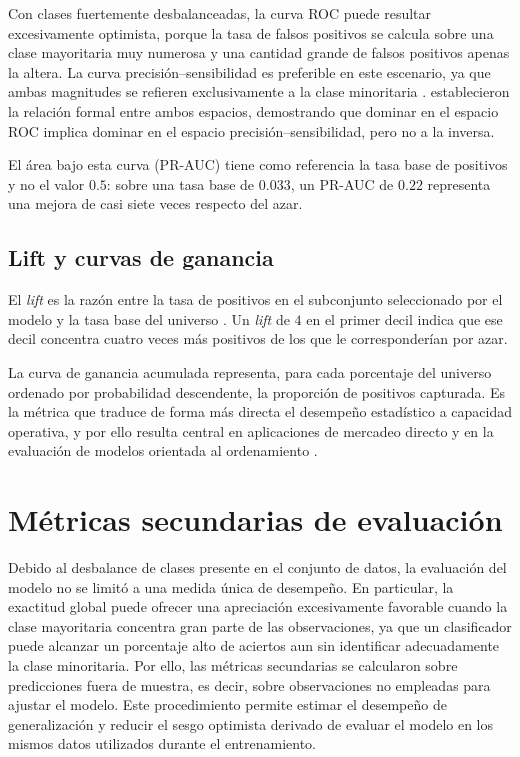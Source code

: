 Con clases fuertemente desbalanceadas, la curva ROC puede resultar excesivamente
optimista, porque la tasa de falsos positivos se calcula sobre una clase
mayoritaria muy numerosa y una cantidad grande de falsos positivos apenas la altera.
La curva precisión--sensibilidad es preferible en este escenario, ya que ambas
magnitudes se refieren exclusivamente a la clase minoritaria
\cite{saito2015precision}.  establecieron la relación
formal entre ambos espacios, demostrando que dominar en el espacio ROC implica
dominar en el espacio precisión--sensibilidad, pero no a la inversa.

El área bajo esta curva (PR-AUC) tiene como referencia la tasa base de positivos y
no el valor $0.5$: sobre una tasa base de $0.033$, un PR-AUC de $0.22$ representa
una mejora de casi siete veces respecto del azar.

\subsection{Lift y curvas de ganancia}

El \emph{lift} es la razón entre la tasa de positivos en el subconjunto
seleccionado por el modelo y la tasa base del universo
\cite{piatetsky1999estimating}. Un \emph{lift} de $4$ en el primer decil indica que
ese decil concentra cuatro veces más positivos de los que le corresponderían por
azar.

La curva de ganancia acumulada representa, para cada porcentaje del universo
ordenado por probabilidad descendente, la proporción de positivos capturada. Es la
métrica que traduce de forma más directa el desempeño estadístico a capacidad
operativa, y por ello resulta central en aplicaciones de mercadeo directo
\cite{ling1998data} y en la evaluación de modelos orientada al ordenamiento
\cite{provost2003tree}.

\section{Métricas secundarias de evaluación}

Debido al desbalance de clases presente en el conjunto de datos, la evaluación del
modelo no se limitó a una medida única de desempeño. En particular, la exactitud
global puede ofrecer una apreciación excesivamente favorable cuando la clase
mayoritaria concentra gran parte de las observaciones, ya que un clasificador puede
alcanzar un porcentaje alto de aciertos aun sin identificar adecuadamente la clase
minoritaria. Por ello, las métricas secundarias se calcularon sobre predicciones
fuera de muestra, es decir, sobre observaciones no empleadas para ajustar el
modelo. Este procedimiento permite estimar el desempeño de generalización y reducir
el sesgo optimista derivado de evaluar el modelo en los mismos datos utilizados
durante el entrenamiento.

